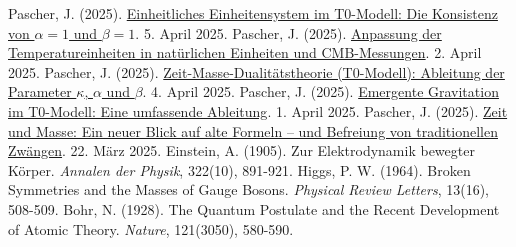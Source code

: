 \documentclass[12pt,a4paper]{article}
\theoremstyle{definition}
\theoremstyle{remark}
\begin{document}
\begin{thebibliography}{99}
		 Pascher, J. (2025). \href{https://github.com/jpascher/T0-Time-Mass-Duality/tree/main/2/pdf/Deutsch/Alpha1Beta1Konsistenz.pdf}{Einheitliches Einheitensystem im T0-Modell: Die Konsistenz von \(\alpha = 1\) und \(\beta = 1\)}. 5. April 2025.
		 Pascher, J. (2025). \href{https://github.com/jpascher/T0-Time-Mass-Duality/tree/main/2/pdf/Deutsch/TempEinheitenCMB.pdf}{Anpassung der Temperatureinheiten in natürlichen Einheiten und CMB-Messungen}. 2. April 2025.
		 Pascher, J. (2025). \href{https://github.com/jpascher/T0-Time-Mass-Duality/tree/main/2/pdf/Deutsch/ZeitMasseT0Params.pdf}{Zeit-Masse-Dualitätstheorie (T0-Modell): Ableitung der Parameter \(\kappa\), \(\alpha\) und \(\beta\)}. 4. April 2025.
		 Pascher, J. (2025). \href{https://github.com/jpascher/T0-Time-Mass-Duality/tree/main/2/pdf/Deutsch/EmergentGravT0.pdf}{Emergente Gravitation im T0-Modell: Eine umfassende Ableitung}. 1. April 2025.
		 Pascher, J. (2025). \href{https://github.com/jpascher/T0-Time-Mass-Duality/tree/main/2/pdf/Deutsch/ZeitMasseNeuerBlick.pdf}{Zeit und Masse: Ein neuer Blick auf alte Formeln – und Befreiung von traditionellen Zwängen}. 22. März 2025.
		 Einstein, A. (1905). Zur Elektrodynamik bewegter Körper. \textit{Annalen der Physik}, 322(10), 891-921.
		 Higgs, P. W. (1964). Broken Symmetries and the Masses of Gauge Bosons. \textit{Physical Review Letters}, 13(16), 508-509.
		 Bohr, N. (1928). The Quantum Postulate and the Recent Development of Atomic Theory. \textit{Nature}, 121(3050), 580-590.
	\end{thebibliography}
	
\end{document}
